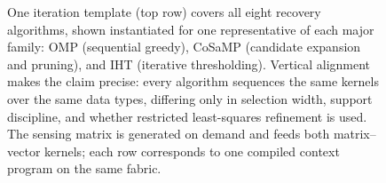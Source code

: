 \begin{figure}[t]
{\begin{tikzpicture}
  \end{tikzpicture}%
  }
  \caption{One iteration template (top row) covers all eight recovery
  algorithms, shown instantiated for one representative of each major
  family: OMP (sequential greedy), CoSaMP (candidate expansion and pruning),
  and IHT (iterative thresholding). Vertical alignment makes the claim
  precise: every algorithm sequences the same kernels over the same data
  types, differing only in selection width, support discipline, and whether
  restricted least-squares refinement is used. The sensing matrix is
  generated on demand and feeds both matrix--vector kernels; each row
  corresponds to one compiled context program on the same fabric.}
  \label{fig:iteration}
\end{figure}
